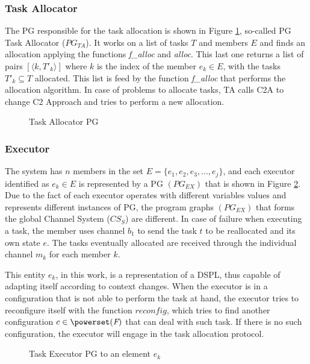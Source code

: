 \subsubsection{Task Allocator} 

The PG responsible for the task allocation is shown in Figure \ref{ta}, so-called PG Task Allocator ($PG_{TA}$). It works on a list of tasks $T$ and members $E$ and finds an allocation applying the functions \textit{f\_alloc} and \textit{alloc}. This last one returns a list of pairs $[\langle k,T'_k \rangle]$ where $k$ is the index of the member $e_k \in E$, with the tasks $T'_k \subseteq T$ allocated. This list is feed by the function \textit{f\_alloc} that performs the allocation algorithm. In case of problems to allocate tasks, TA calls C2A to change C2 Approach and tries to perform a new allocation.

\begin{figure}
\centering

\label{ta}
\caption{Task Allocator PG}
\end{figure}

\subsubsection{Executor} 

The system has $n$ members in the set $E=\{e_1, e_2, e_3, ...,e_j\}$, and each executor identified as $e_k \in E$ is represented by a PG $(PG_{EX})$ that is shown in Figure \ref{executor}. Due to the fact of each executor operates with different variables values and represents different instances of PG, the  program graphs $(PG_{EX})$ that forms the global Channel System ($CS_S$) are different. In case of failure when executing a  task, the member uses channel $b_1$ to send the task $t$ to be reallocated and its own state $e$. The tasks eventually allocated are received through the individual channel $m_k$ for each member $k$.

This entity $e_k$, in this work, is a representation of a DSPL, thus capable of adapting itself according to context changes. When the executor is in a configuration that is not able to perform the task at hand, the executor tries to reconfigure itself with the function $reconfig$, which tries to find another configuration $c \in \powerset(\textit{F})$ that can deal with such task.  If there is no such configuration, the executor will engage in the task allocation protocol.

\begin{figure}[h]
\centering

\label{executor}
\caption{Task Executor PG to an element $e_k$}
\end{figure}
